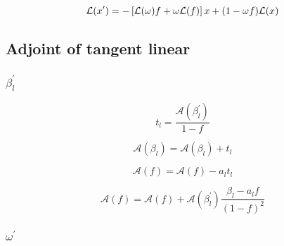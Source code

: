 \begin{equation}
\mathcal{L}(x^{\prime}) = -\left[\mathcal{L}(\omega)f + \omega\mathcal{L}(f)\right]x + (1 - {\omega}f)\mathcal{L}(x)
\label{eq:delta_m_scaling-tangent_linear-tau_l}
\end{equation}


%
\subsection{Adjoint of tangent linear}
\label{sec:delta_m_scaling-adjoint_of_tangent_linear}

\subsubsection{\texorpdfstring{$\beta^{\prime}_{l}$}{Beta}}
\label{sec:delta_m_scaling-adjoint_of_tangent_linear-x_prime_l}

\begin{equation}
t_{l} = \frac{\mathcal{A}(\beta^{\prime}_{l})}{1 - f}
\label{eq:delta_m_scaling-adjoint_of_tangent_linear-x_prime_l_t}
\end{equation}

\begin{equation}
\mathcal{A}(\beta_{l}) = \mathcal{A}(\beta_{l}) + t_{l}
\label{eq:delta_m_scaling-adjoint_of_tangent_linear-x_prime_l_chi_a}
\end{equation}

\begin{equation}
\mathcal{A}(f) = \mathcal{A}(f) - a_{l}t_{l}
\label{eq:delta_m_scaling-adjoint_of_tangent_linear-x_prime_l_f_a}
\end{equation}

\begin{equation}
\mathcal{A}(f) = \mathcal{A}(f) + \mathcal{A}(\beta^{\prime}_{l}) \frac{\beta_{l} - a_{l}f}{(1 - f)^{2}}
\label{eq:delta_m_scaling-adjoint_of_tangent_linear-f_a2}
\end{equation}


\subsubsection{\texorpdfstring{$\omega^{\prime}$}{Omega}}
\label{sec:delta_m_scaling-adjoint_of_tangent_linear-omega_prime}

